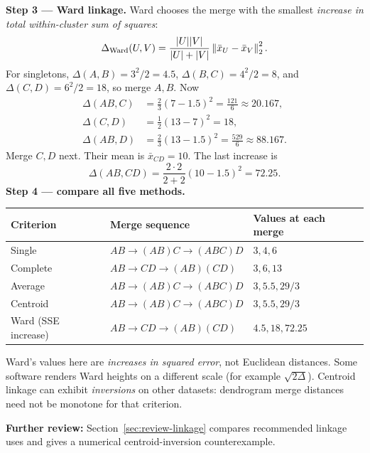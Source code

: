 \textbf{Step 3 --- Ward linkage.} Ward chooses the merge with the smallest \emph{increase in total within-cluster sum of squares}:
\[
\Delta_{\rm Ward}(U,V)=\frac{|U||V|}{|U|+|V|}\left\lVert\bar x_U-\bar x_V\right\rVert_2^2.
\]
For singletons, $\Delta(A,B)=3^2/2=4.5$, $\Delta(B,C)=4^2/2=8$, and $\Delta(C,D)=6^2/2=18$, so merge $A,B$. Now
\[
\begin{aligned}
\Delta(AB,C)&=\frac23(7-1.5)^2=\frac{121}{6}\approx20.167,\\
\Delta(C,D)&=\frac12(13-7)^2=18,\\
\Delta(AB,D)&=\frac23(13-1.5)^2=\frac{529}{6}\approx88.167.
\end{aligned}
\]
Merge $C,D$ next. Their mean is $\bar x_{CD}=10$. The last increase is
\[
\Delta(AB,CD)=\frac{2\cdot2}{2+2}(10-1.5)^2=\boxed{72.25}.
\]
\textbf{Step 4 --- compare all five methods.}
\begin{center}\small
\begin{tabular}{@{}p{2.45cm}p{4.65cm}p{3.45cm}@{}}\toprule
Criterion & Merge sequence & Values at each merge\\\midrule
Single & $AB\to(AB)C\to(ABC)D$ & $3,4,6$\\
Complete & $AB\to CD\to(AB)(CD)$ & $3,6,13$\\
Average & $AB\to(AB)C\to(ABC)D$ & $3,5.5,29/3$\\
Centroid & $AB\to(AB)C\to(ABC)D$ & $3,5.5,29/3$\\
Ward (SSE increase) & $AB\to CD\to(AB)(CD)$ & $4.5,18,72.25$\\\bottomrule
\end{tabular}\end{center}
\begin{important}
Ward's values here are \emph{increases in squared error}, not Euclidean distances. Some software renders Ward heights on a different scale (for example $\sqrt{2\Delta}$). Centroid linkage can exhibit \emph{inversions} on other datasets: dendrogram merge distances need not be monotone for that criterion.
\end{important}

\par\textbf{Further review:} Section~\ref{sec:review-linkage} compares recommended linkage uses and gives a numerical centroid-inversion counterexample.
